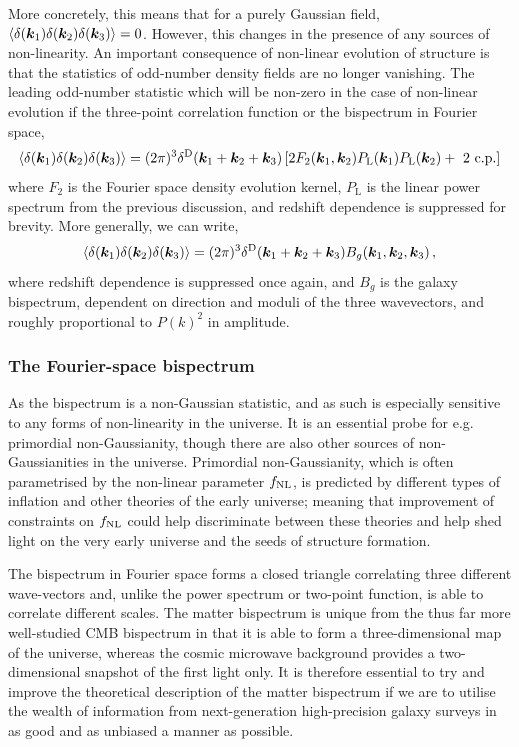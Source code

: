 More concretely, this means that for a purely Gaussian field, $\langle \delta(\bm {k}_1) \delta(\bm {k}_2) \delta(\bm {k}_3)\rangle = 0$. However, this changes in the presence of any sources of non-linearity. An important consequence of non-linear evolution of structure is that the statistics of odd-number density fields are no longer vanishing. The leading odd-number statistic which will be non-zero in the case of non-linear evolution if the three-point correlation function or the bispectrum in Fourier space, 
\begin{equation}
	\langle \delta(\bm {k}_1) \delta(\bm {k}_2) \delta(\bm {k}_3) \rangle = (2 \pi )^3 \delta^\mathrm{D}(\bm {k}_1 + \bm {k}_2 + \bm {k}_3) \left[ 2 F_2(\bm {k}_1,\bm {k}_2) P_\mathrm{L}(\bm {k}_1) P_\mathrm{L}(\bm {k}_2) + \text{ 2 c.p.} \right]
\end{equation}
where $F_2$ is the Fourier space density evolution kernel, $P_\mathrm{L}$ is the linear power spectrum from the previous discussion, and redshift dependence is suppressed for brevity. More generally, we can write, 
\begin{equation}
	\langle \delta(\bm {k}_1) \delta(\bm {k}_2) \delta(\bm {k}_3) \rangle = (2 \pi )^3 \delta^\mathrm{D}(\bm {k}_1 + \bm {k}_2 + \bm {k}_3) B_g(\bm {k}_1,\bm {k}_2,\bm {k}_3)\,,
\end{equation}
where redshift dependence is suppressed once again, and $B_g$ is the galaxy bispectrum, dependent on direction and moduli of the three wavevectors, and roughly proportional to $P(k)^2$ in amplitude.


\subsubsection{The Fourier-space bispectrum}

As the bispectrum is a non-Gaussian statistic, and as such is especially sensitive to any forms of non-linearity in the universe. It is an essential probe for e.g. primordial non-Gaussianity, though there are also other sources of non-Gaussianities in the universe. Primordial non-Gaussianity, which is often parametrised by the non-linear parameter $f_\text{NL}$, is predicted by different types of inflation and other theories of the early universe; meaning that improvement of constraints on $f_\text{NL}$ could help discriminate between these theories and help shed light on the very early universe and the seeds of structure formation. 

The bispectrum in Fourier space forms a closed triangle correlating three different wave-vectors and, unlike the power spectrum or two-point function, is able to correlate different scales. The matter bispectrum is unique from the thus far more well-studied CMB bispectrum in that it is able to form a three-dimensional map of the universe, whereas the cosmic microwave background provides a two-dimensional snapshot of the first light only. It is therefore essential to try and improve the theoretical description of the matter bispectrum if we are to utilise the wealth of information from next-generation high-precision galaxy surveys in as good and as unbiased a manner as possible. 

